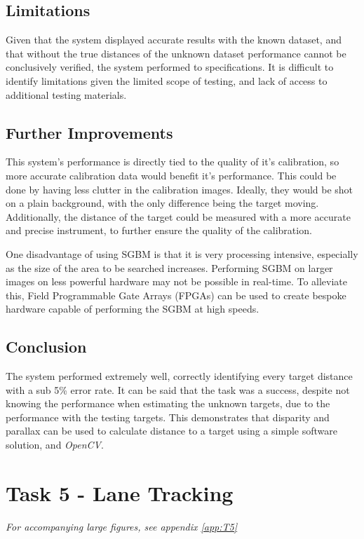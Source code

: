 \documentclass[conference]{IEEEtran}
\begin{document}
\subsection{Limitations}
Given that the system displayed accurate results with the known dataset, and that without the true distances of the unknown dataset performance cannot be conclusively verified, the system performed to specifications. It is difficult to identify limitations given the limited scope of testing, and lack of access to additional testing materials.

\subsection{Further Improvements} \label{sec:further1}
 This system's performance is directly tied to the quality of it's calibration, so more accurate calibration data would benefit it's performance. This could be done by having less clutter in the calibration images. Ideally, they would be shot on a plain background, with the only difference being the target moving. Additionally, the distance of the target could be measured with a more accurate and precise instrument, to further ensure the quality of the calibration.
 
One disadvantage of using SGBM is that it is very processing intensive, especially as the size of the area to be searched increases. Performing SGBM on larger images on less powerful hardware may not be possible in real-time. To alleviate this, Field Programmable Gate Arrays (FPGAs) can be used to create bespoke hardware capable of performing the SGBM at high speeds\cite{HardwareSGBM}.
\subsection{Conclusion}
The system performed extremely well, correctly identifying every target distance with a sub 5\% error rate. It can be said that the task was a success, despite not knowing the performance when estimating the unknown targets, due to the performance with the testing targets. This demonstrates that disparity and parallax can be used to calculate distance to a target using a simple software solution, and \textit{OpenCV}. 

\section{Task 5 - Lane Tracking}
\textit{For accompanying large figures, see appendix \ref{app:T5}}
\end{document}
